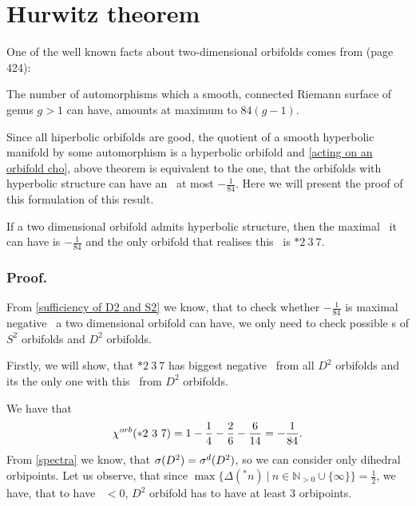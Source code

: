 \section{Hurwitz theorem}\label{największy orbifold}
One of the well known facts about two-dimensional orbifolds comes from \cite{Hurwitz1893} 
(page 424):
\begin{theorem}
The number of automorphisms which a smooth, connected Riemann surface of genus $g>1$ can have,  
amounts at maximum to $84(g-1)$. 
\end{theorem}
Since all hiperbolic orbifolds are good, the quotient of a 
smooth hyperbolic manifold by some automorphism is a hyperbolic orbifold and 
\ref{acting on an orbifold cho}, above theorem  
is equivalent to the one, that the orbifolds 
with hyperbolic structure can have an \Eoc\ at most $-\frac{1}{84}$. 
Here we will present the proof of this formulation of this result. 
\begin{theorem}
If a two dimensional orbifold admits hyperbolic structure, then the maximal \Eoc\ it can 
have is $-\frac{1}{84}$ and the only orbifold that realises this \Eoc\ is $*2\ 3\ 7$.
\end{theorem}
\subsubsection{Proof.}
From \ref{sufficiency of D2 and S2} we know, that to check whether $-\frac{1}{84}$ is maximal 
negative \Eoc\ a two dimensional orbifold can have, we only need to check possible 
\Eoc s of $S^2$ orbifolds and $D^2$ orbifolds. 

Firstly, we will show, that $*2\ 3\ 7$ has biggest negative \Eoc\ from all $D^2$ orbifolds 
and its the only one with this \Eoc\ from $D^2$ orbifolds.

We have that 
\begin{equation}
{\chi^{orb}(*2\ 3\ 7)} = 1 - \frac{1}{4} - \frac{2}{6} - \frac{6}{14} = -\frac{1}{84}. 
\end{equation}
From \ref{spectra} we know, that ${{\sigma}(D^2)} = {\sigma}^d(D^2)$, so we can consider only dihedral 
orbipoints. 
Let us observe, that since 
$\max\{\Delta(^*n)\ |\ n \in \mathbb{N}_{>0} \cup \{\infty\}\} = \frac{1}{2}$, we have, that 
to have \Eoc\ $<0$, 
$D^2$ orbifold has to have at least $3$ orbipoints.
 
